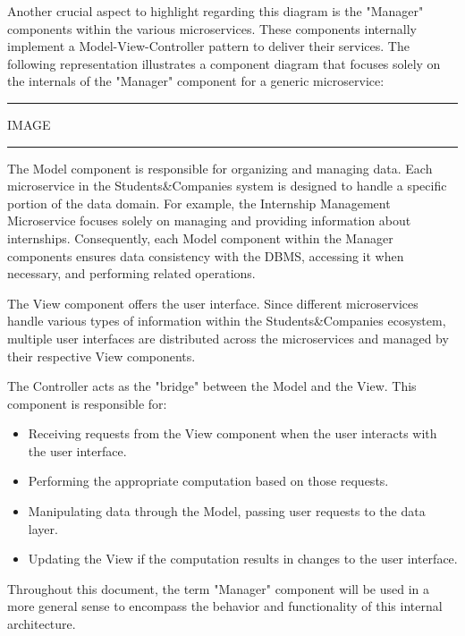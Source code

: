 Another crucial aspect to highlight regarding this diagram is the "Manager" components within the various microservices. These components internally implement a Model-View-Controller pattern to deliver their services. The following representation illustrates a component diagram that focuses solely on the internals of the "Manager" component for a generic microservice:

\vspace{20pt}
\hrule
\vspace{10pt}
IMAGE
\vspace{10pt}
\hrule
\vspace{20pt}

The Model component is responsible for organizing and managing data. Each microservice in the Students\&Companies system is designed to handle a specific portion of the data domain. For example, the Internship Management Microservice focuses solely on managing and providing information about internships. Consequently, each Model component within the Manager components ensures data consistency with the DBMS, accessing it when necessary, and performing related operations.

The View component offers the user interface. Since different microservices handle various types of information within the Students\&Companies ecosystem, multiple user interfaces are distributed across the microservices and managed by their respective View components.

The Controller acts as the "bridge" between the Model and the View. This component is responsible for:
\begin{itemize}
    \item Receiving requests from the View component when the user interacts with the user interface.
    \item Performing the appropriate computation based on those requests.
    \item Manipulating data through the Model, passing user requests to the data layer.
    \item Updating the View if the computation results in changes to the user interface.
\end{itemize}

Throughout this document, the term "Manager" component will be used in a more general sense to encompass the behavior and functionality of this internal architecture.

